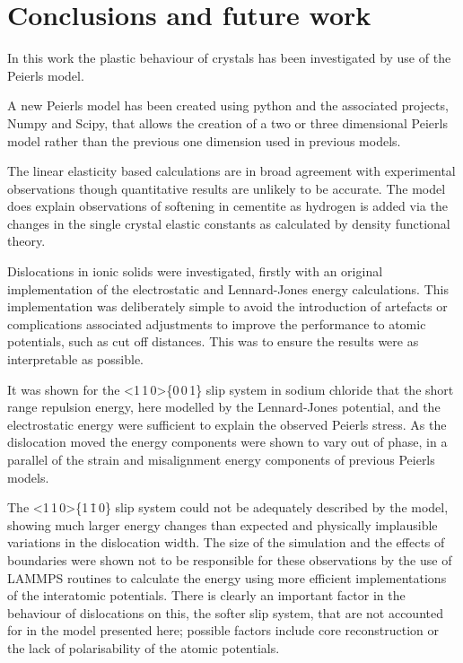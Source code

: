 \chapter{Conclusions and future work}



In this work the plastic behaviour of crystals has been investigated by use of the Peierls model. 

A new Peierls model has been created using python and the associated projects, Numpy and Scipy, that allows the creation of a two or three dimensional Peierls model rather than the previous one dimension used in previous models.

The linear elasticity based calculations are in broad agreement with experimental observations though quantitative results are unlikely to be accurate. The model does explain observations of softening in cementite as hydrogen is added via the changes in the single crystal elastic constants as calculated by density functional theory.

Dislocations in ionic solids were investigated, firstly with an original implementation of the electrostatic and Lennard-Jones energy calculations. This implementation was deliberately simple to avoid the introduction of artefacts or complications associated adjustments to improve the performance to atomic potentials, such as cut off distances. This was to ensure the results were as interpretable as possible.

It was shown for the <1\,1\,0>\{0\,0\,1\} slip system in sodium chloride that the short range repulsion energy, here modelled by the Lennard-Jones potential, and the electrostatic energy were sufficient to explain the observed Peierls stress. As the dislocation moved the energy components were shown to vary out of phase, in a parallel of the strain and misalignment energy components of previous Peierls models.

The <1\,1\,0>\{1\,\={1}\,0\} slip system could not be adequately described by the model, showing much larger energy changes than expected and physically implausible variations in the dislocation width. The size of the simulation and the effects of boundaries were shown not to be responsible for these observations by the use of LAMMPS routines to calculate the energy using more efficient implementations of the interatomic potentials. There is clearly an important factor in the behaviour of dislocations on this, the softer slip system, that are not accounted for in the model presented here; possible factors include core reconstruction or the lack of polarisability of the atomic potentials.

